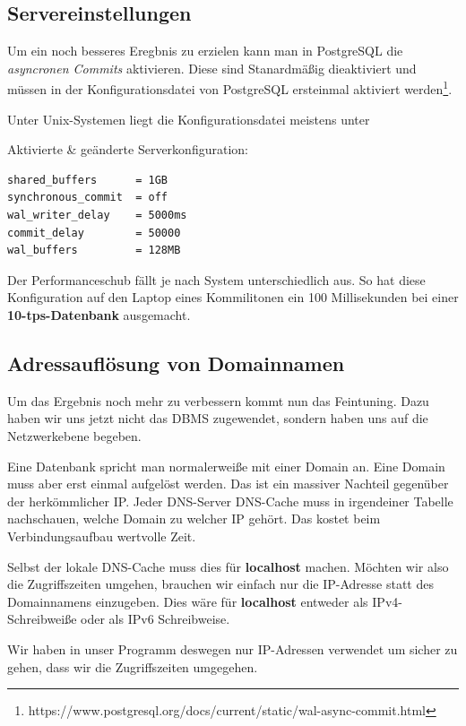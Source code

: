 \subsection{Servereinstellungen}

Um ein noch besseres Eregbnis zu erzielen kann man in PostgreSQL die
\textit{asyncronen Commits} aktivieren. Diese sind Stanardmäßig dieaktiviert und
müssen in der Konfigurationsdatei von PostgreSQL ersteinmal aktiviert werden\footnote{https://www.postgresql.org/docs/current/static/wal-async-commit.html}.

Unter Unix-Systemen liegt die Konfigurationsdatei meistens unter \newline
{}

Aktivierte \& geänderte Serverkonfiguration:
\begin{lstlisting}[title={Veränderte Serverkonfiguration}]
shared_buffers		= 1GB
synchronous_commit	= off
wal_writer_delay	= 5000ms
commit_delay		= 50000
wal_buffers			= 128MB
\end{lstlisting}

Der Performanceschub fällt je nach System unterschiedlich aus. So hat diese
Konfiguration auf den Laptop eines Kommilitonen ein 100 Millisekunden bei einer
\textbf{10-tps-Datenbank} ausgemacht.

\subsection{Adressauflösung von Domainnamen}
Um das Ergebnis noch mehr zu verbessern kommt nun das Feintuning. Dazu
haben wir uns jetzt nicht das DBMS zugewendet, sondern haben uns auf die
Netzwerkebene begeben.

Eine Datenbank spricht man normalerweiße mit einer Domain an. 
Eine Domain muss aber erst einmal aufgelöst werden.
Das ist ein massiver Nachteil gegenüber der herkömmlicher IP. Jeder
DNS-Server \bzw DNS-Cache muss in irgendeiner Tabelle nachschauen, welche Domain
zu welcher IP gehört. Das kostet beim Verbindungsaufbau wertvolle Zeit.

Selbst der lokale DNS-Cache muss dies \zB für \textbf{localhost} machen.
Möchten wir also die Zugriffszeiten umgehen, brauchen wir einfach nur die IP-Adresse
statt des Domainnamens einzugeben. Dies wäre für \textbf{localhost} entweder  als
IPv4-Schreibweiße oder \gqq{[::1]} als IPv6 Schreibweise.

Wir haben in unser Programm deswegen nur IP-Adressen verwendet um sicher zu gehen, dass wir 
die Zugriffszeiten umgegehen.
\clearpage